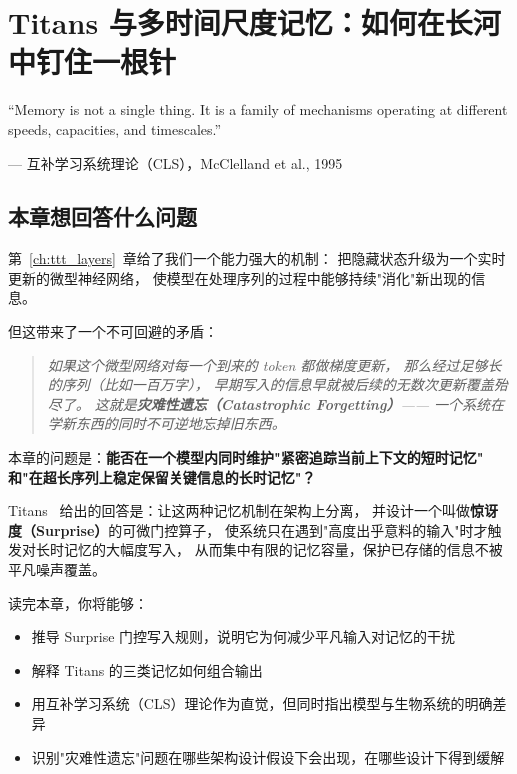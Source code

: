 \chapter{Titans 与多时间尺度记忆：如何在长河中钉住一根针}
\label{ch:titans}

\epigraph{``Memory is not a single thing. It is a family of mechanisms operating at
different speeds, capacities, and timescales.''}{--- 互补学习系统理论（CLS），McClelland et al., 1995}

\section{本章想回答什么问题}
\label{sec:titans_question}

第~\ref{ch:ttt_layers}~章给了我们一个能力强大的机制：
把隐藏状态升级为一个实时更新的微型神经网络，
使模型在处理序列的过程中能够持续"消化"新出现的信息。

但这带来了一个不可回避的矛盾：

\begin{quote}
\textit{如果这个微型网络对每一个到来的 token 都做梯度更新，
那么经过足够长的序列（比如一百万字），
早期写入的信息早就被后续的无数次更新覆盖殆尽了。
这就是\textbf{灾难性遗忘（Catastrophic Forgetting）}——
一个系统在学新东西的同时不可逆地忘掉旧东西。}
\end{quote}

本章的问题是：\textbf{能否在一个模型内同时维护"紧密追踪当前上下文的短时记忆"
和"在超长序列上稳定保留关键信息的长时记忆"？}

Titans~\citep{behrouz2024titans} 给出的回答是：让这两种记忆机制在架构上分离，
并设计一个叫做\textbf{惊讶度（Surprise）}的可微门控算子，
使系统只在遇到"高度出乎意料的输入"时才触发对长时记忆的大幅度写入，
从而集中有限的记忆容量，保护已存储的信息不被平凡噪声覆盖。

读完本章，你将能够：
\begin{itemize}
  \item 推导 Surprise 门控写入规则，说明它为何减少平凡输入对记忆的干扰
  \item 解释 Titans 的三类记忆如何组合输出
  \item 用互补学习系统（CLS）理论作为直觉，但同时指出模型与生物系统的明确差异
  \item 识别"灾难性遗忘"问题在哪些架构设计假设下会出现，在哪些设计下得到缓解
\end{itemize}

